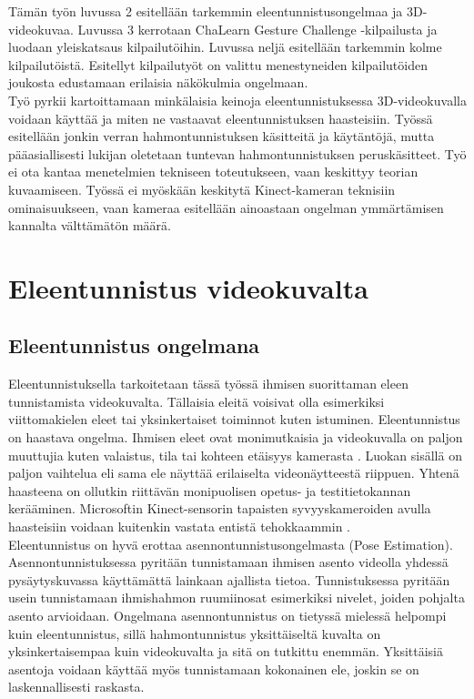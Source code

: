 Tämän työn luvussa 2 esitellään tarkemmin eleentunnistusongelmaa ja 3D-videokuvaa. Luvussa 3 kerrotaan
ChaLearn Gesture Challenge -kilpailusta ja luodaan yleiskatsaus kilpailutöihin. Luvussa neljä esitellään
tarkemmin kolme kilpailutöistä. Esitellyt kilpailutyöt on valittu menestyneiden kilpailutöiden joukosta edustamaan erilaisia näkökulmia ongelmaan.\\

Työ pyrkii kartoittamaan minkälaisia keinoja eleentunnistuksessa 3D-videokuvalla voidaan käyttää ja miten ne vastaavat eleentunnistuksen haasteisiin.
Työssä esitellään jonkin verran hahmontunnistuksen käsitteitä ja käytäntöjä, mutta pääasiallisesti lukijan oletetaan tuntevan hahmontunnistuksen 
peruskäsitteet. Työ ei ota kantaa menetelmien tekniseen toteutukseen, vaan keskittyy teorian kuvaamiseen. Työssä ei myöskään keskitytä Kinect-kameran
teknisiin ominaisuukseen, vaan kameraa esitellään ainoastaan ongelman ymmärtämisen kannalta välttämätön määrä.


\section{Eleentunnistus videokuvalta}
\label{eleentunnistus videokuvalta}


\subsection{Eleentunnistus ongelmana}
Eleentunnistuksella tarkoitetaan tässä työssä ihmisen suorittaman eleen tunnistamista videokuvalta. Tällaisia eleitä voisivat olla esimerkiksi
viittomakielen eleet tai yksinkertaiset toiminnot kuten istuminen. Eleentunnistus on haastava ongelma. Ihmisen eleet ovat
monimutkaisia ja videokuvalla on paljon muuttujia kuten valaistus, tila tai kohteen etäisyys kamerasta \citep {6239178}. 
Luokan sisällä on paljon vaihtelua eli sama ele näyttää erilaiselta videonäytteestä riippuen.
Yhtenä haasteena on ollutkin riittävän monipuolisen opetus- ja testitietokannan kerääminen.
\citep{4587756} Microsoftin Kinect-sensorin tapaisten syvyyskameroiden avulla haasteisiin voidaan kuitenkin vastata entistä tehokkaammin \citep {6239178}.\\

Eleentunnistus on hyvä erottaa asennontunnistusongelmasta (Pose Estimation).
Asennontunnistuksessa pyritään tunnistamaan ihmisen asento videolla yhdessä pysäytyskuvassa
käyttämättä lainkaan ajallista tietoa. Tunnistuksessa pyritään usein tunnistamaan ihmishahmon ruumiinosat esimerkiksi nivelet,
joiden pohjalta asento arvioidaan. \citep{5995316} Ongelmana asennontunnistus on tietyssä mielessä helpompi
kuin eleentunnistus, sillä hahmontunnistus yksittäiseltä kuvalta on yksinkertaisempaa kuin videokuvalta ja sitä on tutkittu enemmän. 
Yksittäisiä asentoja voidaan käyttää myös tunnistamaan kokonainen ele, joskin se on laskennallisesti raskasta.  \\

